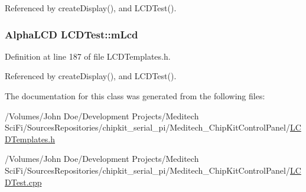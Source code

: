 Referenced by create\-Display(), and L\-C\-D\-Test().

\hypertarget{class_l_c_d_test_a4d8379716e37edc20fafb9c4a24c253f}{
\subsubsection[{m\-Lcd}]{\setlength{\rightskip}{0pt plus 5cm}Alpha\-L\-C\-D L\-C\-D\-Test\-::m\-Lcd\hspace{0.3cm}{\ttfamily [private]}}}\label{class_l_c_d_test_a4d8379716e37edc20fafb9c4a24c253f}


Definition at line 187 of file L\-C\-D\-Templates.\-h.



Referenced by create\-Display(), and L\-C\-D\-Test().



The documentation for this class was generated from the following files\-:\begin{DoxyCompactItemize}
\item 
/\-Volumes/\-John Doe/\-Development Projects/\-Meditech Sci\-Fi/\-Sources\-Repositories/chipkit\-\_\-serial\-\_\-pi/\-Meditech\-\_\-\-Chip\-Kit\-Control\-Panel/\hyperlink{_l_c_d_templates_8h}{L\-C\-D\-Templates.\-h}\item 
/\-Volumes/\-John Doe/\-Development Projects/\-Meditech Sci\-Fi/\-Sources\-Repositories/chipkit\-\_\-serial\-\_\-pi/\-Meditech\-\_\-\-Chip\-Kit\-Control\-Panel/\hyperlink{_l_c_d_test_8cpp}{L\-C\-D\-Test.\-cpp}\end{DoxyCompactItemize}
